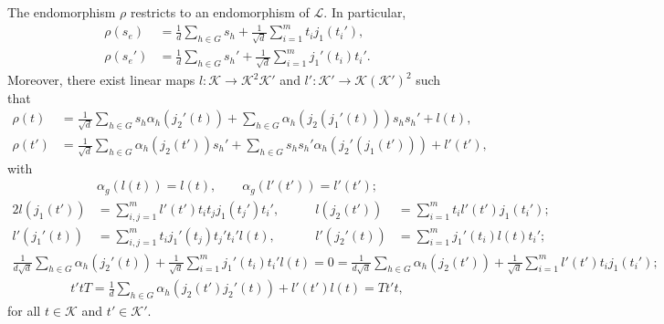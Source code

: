 \noindent\begin{lemma}\label{Rho} The endomorphism $\rho$ restricts to an endomorphism of $\mathcal{L}$. In particular,
\begin{align*}
\rho(s_e) &= \frac{1}{d}\sum_{h \in G}s_h + \frac{1}{\sqrt{d}}\sum_{i=1}^m t_i j_1(t_i'),\\%
\rho(s_e') &= \frac{1}{d}\sum_{h \in G}s_h' + \frac{1}{\sqrt{d}}\sum_{i=1}^m j_1'(t_i)t_i'.%
\end{align*}
\noindent Moreover, there exist linear maps $l : \mathcal{K} \to \mathcal{K}^2\mathcal{K}'$ and $l' : \mathcal{K}' \to \mathcal{K}(\mathcal{K}')^2$ such that
\begin{align*}
\rho(t) &= \frac{1}{\sqrt{d}}\sum_{h \in G}s_h\alpha_h(j_2'(t)) + \sum_{h \in G} \alpha_h(j_2(j_1'(t)))s_hs_h' + l(t),\\%
\rho(t') &= \frac{1}{\sqrt{d}}\sum_{h \in G}\alpha_h(j_2(t'))s_h' + \sum_{h \in G} s_hs_h'\alpha_h(j_2'(j_1(t'))) + l'(t'),%
\end{align*}
\noindent with
\begin{align}
\alpha_g(l(t)) = l(t),\qquad \alpha_g(l'(t')) = l'(t');\label{lInvariance}
\end{align}
\begin{alignat}{2}
l(j_1(t')) &= \sum_{i,j=1}^m l'(t')t_it_j j_1(t_j')t_i',\qquad &l(j_2(t')) &= \sum_{i=1}^m t_i l'(t') j_1(t_i');\label{ljMaps}\\
l'(j_1'(t)) &= \sum_{i,j=1}^m t_i j_1'(t_j)t_j't_i' l(t),\qquad &l'(j_2'(t)) &= \sum_{i=1}^m j_1'(t_i)l(t)t_i';\label{l'jMaps}
\end{alignat}
\begin{align}
\frac{1}{d\sqrt{d}}\sum_{h \in G}\alpha_h(j_2'(t)) + \frac{1}{\sqrt{d}}\sum_{i=1}^m j_1'(t_i)t_i'l(t) = 0 = \frac{1}{d\sqrt{d}}\sum_{h \in G}\alpha_h(j_2(t')) + \frac{1}{\sqrt{d}}\sum_{i=1}^m l'(t')t_ij_1(t_i');\label{GroupMultiplicityZero}
\end{align}
\begin{align}
t'tT = \frac{1}{d}\sum_{h \in G}\alpha_h(j_2(t')j_2'(t)) + l'(t')l(t) = Tt't,\label{TIdentity}
\end{align}
\noindent for all $t \in \mathcal{K}$ and $t' \in \mathcal{K}'$.\\
\end{lemma}

